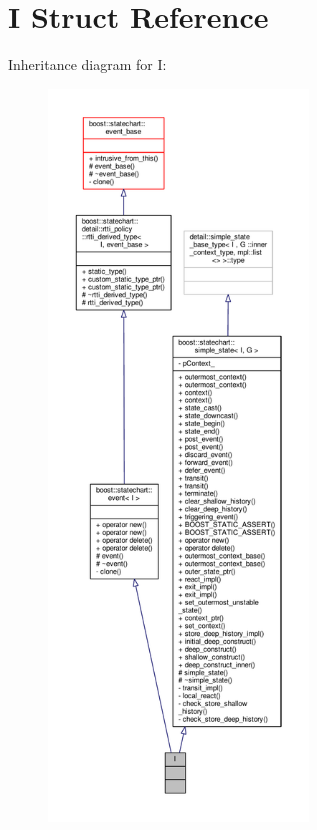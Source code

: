 \hypertarget{struct_i}{}\section{I Struct Reference}
\label{struct_i}


Inheritance diagram for I\+:
\nopagebreak
\begin{figure}[H]
\begin{center}
\leavevmode
\includegraphics[height=550pt]{struct_i__inherit__graph}
\end{center}
\end{figure}


